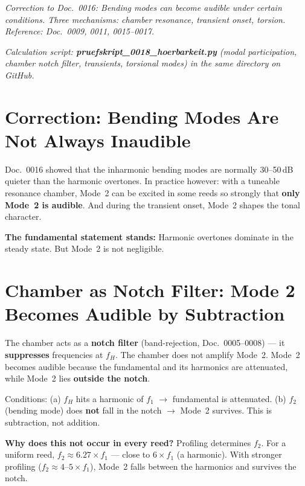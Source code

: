 \documentclass[11pt,a4paper]{article}
\begin{document}
\hbmaketitle
\noindent\textit{Correction to Doc.~0016: Bending modes can become audible under certain conditions.
Three mechanisms: chamber resonance, transient onset, torsion.
Reference: Doc.~0009, 0011, 0015--0017.}

\noindent\textit{\small Calculation script:
\textbf{pruefskript\_0018\_hoerbarkeit.py} (modal participation,
chamber notch filter, transients, torsional modes) in the same directory on GitHub.}

\section{Correction: Bending Modes Are Not Always Inaudible}

Doc.~0016 showed that the inharmonic bending modes are normally
30--50\,dB quieter than the harmonic overtones.
In practice however: with a tuneable resonance chamber, Mode~2 can be excited
in some reeds so strongly that \textbf{only Mode~2 is audible}.
And during the transient onset, Mode~2 shapes the tonal character.

\begin{tcolorbox}[colframe=red!60!black, colback=red!5!white]
\textbf{The fundamental statement stands:} Harmonic overtones dominate
in the steady state. But Mode~2 is not negligible.
\end{tcolorbox}

\section{Chamber as Notch Filter: Mode 2 Becomes Audible by Subtraction}

The chamber acts as a \textbf{notch filter} (band-rejection, Doc.~0005--0008) ---
it \textbf{suppresses} frequencies at $f_H$. The chamber does not amplify Mode~2.
Mode~2 becomes audible because the fundamental and its harmonics are attenuated,
while Mode~2 lies \textbf{outside the notch}.

Conditions: (a) $f_H$ hits a harmonic of $f_1$ $\to$ fundamental is attenuated.
(b) $f_2$ (bending mode) does \textbf{not} fall in the notch
$\to$ Mode~2 survives. This is subtraction, not addition.

\textbf{Why does this not occur in every reed?} Profiling determines $f_2$.
For a uniform reed, $f_2 \approx 6{.}27 \times f_1$ --- close to $6 \times f_1$ (a harmonic).
With stronger profiling ($f_2 \approx 4$--$5 \times f_1$),
Mode~2 falls between the harmonics and survives the notch.
\end{document}
